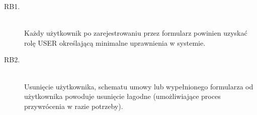 \begin{description}
    \item[RB1.] \hfill \\
    Każdy użytkownik po zarejestrowaniu przez formularz powinien uzyskać rolę USER określającą minimalne uprawnienia w systemie. 
    
    \item[RB2.] \hfill \\
    Usunięcie użytkownika, schematu umowy lub wypełnionego formularza od użytkownika powoduje usunięcie łagodne (umożliwiające proces przywrócenia w razie potrzeby).
\end{description}